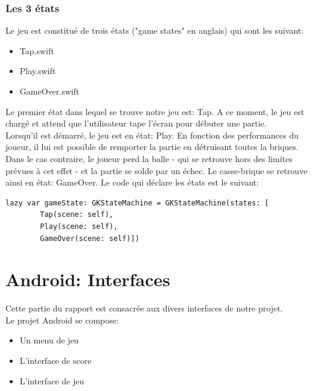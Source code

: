 \documentclass[a4paper]{article}
\begin{document}
\subsubsection{Les 3 états}
Le jeu est constitué de trois états ("game states" en anglais) qui sont les suivant:
\begin{itemize}
 \item Tap.swift
 \item Play.swift
 \item GameOver.swift
\end{itemize}
Le premier état dans lequel se trouve notre jeu est: Tap. A ce moment, le jeu est chargé et attend que l'utilisateur tape l’écran pour débuter une partie.\\
Lorsqu'il est démarré, le jeu est en état: Play. En fonction des performances du joueur, il lui est possible de remporter la partie en détruisant toutes la briques. Dans le cas contraire, le joueur perd la balle - qui se retrouve hors des limites prévues à cet effet - et la partie se solde par un échec. Le casse-brique se retrouve ainsi en état: GameOver.
Le code qui déclare les états est le suivant:
\begin{verbatim}
lazy var gameState: GKStateMachine = GKStateMachine(states: [
        Tap(scene: self),
        Play(scene: self),
        GameOver(scene: self)])
\end{verbatim}

\section{Android: Interfaces}
Cette partie du rapport est consacrée aux divers interfaces de notre projet.\\
Le projet Android se compose:
\begin{itemize}
 \item Un menu de jeu
 \item L'interface de score
 \item L'interface de jeu
\end{itemize}
\end{document}
